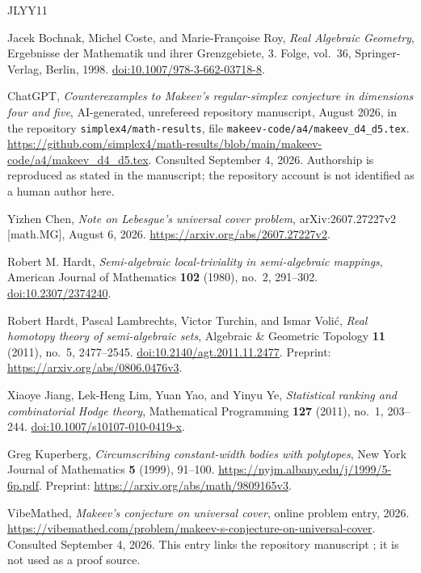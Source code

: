 \documentclass[11pt,reqno]{amsart}
\theoremstyle{definition}
\theoremstyle{remark}
\numberwithin{equation}{section}
\begin{document}
\begin{thebibliography}{JLYY11}

Jacek Bochnak, Michel Coste, and Marie-Fran\c{c}oise Roy,
\emph{Real Algebraic Geometry}, Ergebnisse der Mathematik und ihrer
Grenzgebiete, 3. Folge, vol.~36, Springer-Verlag, Berlin, 1998.
\href{https://doi.org/10.1007/978-3-662-03718-8}
{doi:10.1007/978-3-662-03718-8}.

ChatGPT,
\emph{Counterexamples to Makeev's regular-simplex conjecture in
dimensions four and five}, AI-generated, unrefereed repository
manuscript, August 2026, in the repository
\texttt{simplex4/math-results}, file
\texttt{makeev-code/a4/makeev\_d4\_d5.tex}.
\url{https://github.com/simplex4/math-results/blob/main/makeev-code/a4/makeev_d4_d5.tex}.
Consulted September 4, 2026. Authorship is reproduced as stated in
the manuscript; the repository account is not identified as a human
author here.

Yizhen Chen,
\emph{Note on Lebesgue's universal cover problem},
arXiv:2607.27227v2 [math.MG], August 6, 2026.
\url{https://arxiv.org/abs/2607.27227v2}.

Robert M. Hardt,
\emph{Semi-algebraic local-triviality in semi-algebraic mappings},
American Journal of Mathematics \textbf{102} (1980), no.~2, 291--302.
\href{https://doi.org/10.2307/2374240}{doi:10.2307/2374240}.

Robert Hardt, Pascal Lambrechts, Victor Turchin, and Ismar Voli\'c,
\emph{Real homotopy theory of semi-algebraic sets},
Algebraic \& Geometric Topology \textbf{11} (2011), no.~5, 2477--2545.
\href{https://doi.org/10.2140/agt.2011.11.2477}
{doi:10.2140/agt.2011.11.2477}.
Preprint: \url{https://arxiv.org/abs/0806.0476v3}.

Xiaoye Jiang, Lek-Heng Lim, Yuan Yao, and Yinyu Ye,
\emph{Statistical ranking and combinatorial Hodge theory},
Mathematical Programming \textbf{127} (2011), no.~1, 203--244.
\href{https://doi.org/10.1007/s10107-010-0419-x}
{doi:10.1007/s10107-010-0419-x}.

Greg Kuperberg,
\emph{Circumscribing constant-width bodies with polytopes},
New York Journal of Mathematics \textbf{5} (1999), 91--100.
\url{https://nyjm.albany.edu/j/1999/5-6p.pdf}.
Preprint: \url{https://arxiv.org/abs/math/9809165v3}.

VibeMathed,
\emph{Makeev's conjecture on universal cover}, online problem entry,
2026. \url{https://vibemathed.com/problem/makeev-s-conjecture-on-universal-cover}.
Consulted September 4, 2026. This entry links the repository
manuscript \cite{ChatGPT2026}; it is not used as a proof source.

\end{thebibliography}
\end{document}
